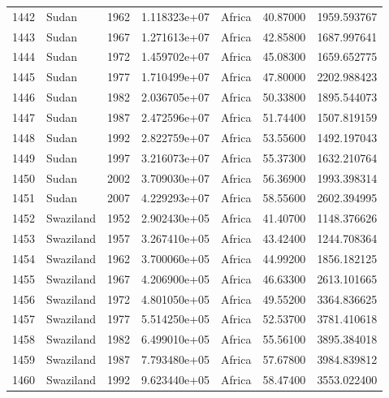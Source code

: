 \documentclass[
  letterpaper,
  DIV=11,
  numbers=noendperiod]{scrreprt}
\begin{document}
\begin{tabular}{llrrlrr}
1442 &                     Sudan &  1962 &  1.118323e+07 &    Africa &  40.87000 &    1959.593767 \\
1443 &                     Sudan &  1967 &  1.271613e+07 &    Africa &  42.85800 &    1687.997641 \\
1444 &                     Sudan &  1972 &  1.459702e+07 &    Africa &  45.08300 &    1659.652775 \\
1445 &                     Sudan &  1977 &  1.710499e+07 &    Africa &  47.80000 &    2202.988423 \\
1446 &                     Sudan &  1982 &  2.036705e+07 &    Africa &  50.33800 &    1895.544073 \\
1447 &                     Sudan &  1987 &  2.472596e+07 &    Africa &  51.74400 &    1507.819159 \\
1448 &                     Sudan &  1992 &  2.822759e+07 &    Africa &  53.55600 &    1492.197043 \\
1449 &                     Sudan &  1997 &  3.216073e+07 &    Africa &  55.37300 &    1632.210764 \\
1450 &                     Sudan &  2002 &  3.709030e+07 &    Africa &  56.36900 &    1993.398314 \\
1451 &                     Sudan &  2007 &  4.229293e+07 &    Africa &  58.55600 &    2602.394995 \\
1452 &                 Swaziland &  1952 &  2.902430e+05 &    Africa &  41.40700 &    1148.376626 \\
1453 &                 Swaziland &  1957 &  3.267410e+05 &    Africa &  43.42400 &    1244.708364 \\
1454 &                 Swaziland &  1962 &  3.700060e+05 &    Africa &  44.99200 &    1856.182125 \\
1455 &                 Swaziland &  1967 &  4.206900e+05 &    Africa &  46.63300 &    2613.101665 \\
1456 &                 Swaziland &  1972 &  4.801050e+05 &    Africa &  49.55200 &    3364.836625 \\
1457 &                 Swaziland &  1977 &  5.514250e+05 &    Africa &  52.53700 &    3781.410618 \\
1458 &                 Swaziland &  1982 &  6.499010e+05 &    Africa &  55.56100 &    3895.384018 \\
1459 &                 Swaziland &  1987 &  7.793480e+05 &    Africa &  57.67800 &    3984.839812 \\
1460 &                 Swaziland &  1992 &  9.623440e+05 &    Africa &  58.47400 &    3553.022400 \\

\end{tabular}
\end{document}
